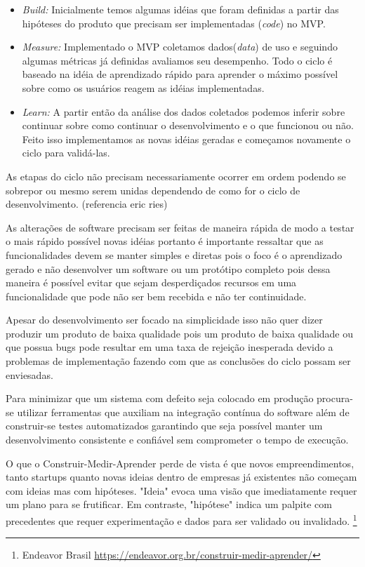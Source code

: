 \begin{itemize}
\item \emph{Build:} Inicialmente temos algumas idéias que foram definidas a partir das hipóteses do produto que precisam ser implementadas (\emph{code}) no MVP.
\item \emph{Measure:} Implementado o MVP coletamos dados(\emph{data}) de uso e seguindo algumas métricas já definidas avaliamos seu desempenho. Todo o ciclo é baseado na idéia de aprendizado rápido para aprender o máximo possível sobre como os usuários reagem as idéias implementadas.
\item \emph{Learn:} A partir então da análise dos dados coletados podemos inferir sobre continuar sobre como continuar o desenvolvimento e o que funcionou ou não. Feito isso implementamos as novas idéias geradas e começamos novamente o ciclo para validá-las.
\end{itemize}
\par As etapas do ciclo não precisam necessariamente ocorrer em ordem podendo se sobrepor  ou mesmo serem unidas dependendo de como for o ciclo de desenvolvimento. (referencia eric ries)
\par As alterações de software precisam ser feitas de maneira rápida de modo a testar o mais rápido possível novas idéias portanto é importante ressaltar que as funcionalidades devem se manter simples e diretas pois o foco é o aprendizado gerado e não desenvolver um software ou um protótipo completo pois dessa maneira é possível evitar que sejam desperdiçados recursos em uma funcionalidade que pode não ser bem recebida e não ter continuidade.
\par  Apesar do desenvolvimento ser focado na simplicidade isso não quer dizer produzir um produto de baixa qualidade pois um produto de baixa qualidade ou que possua bugs pode resultar em uma taxa de rejeição inesperada devido a problemas de implementação fazendo com que as conclusões do ciclo possam ser enviesadas.
\par Para minimizar que um sistema com defeito seja colocado em produção procura-se utilizar ferramentas que auxiliam na integração contínua do software além de construir-se testes automatizados garantindo que seja possível manter um desenvolvimento consistente e confiável sem comprometer o tempo de execução.
\par O que o Construir-Medir-Aprender perde de vista é que novos empreendimentos, tanto startups quanto novas ideias dentro de empresas já existentes não começam com ideias mas com hipóteses. "Ideia" evoca uma visão que imediatamente requer um plano para se frutificar. Em contraste, "hipótese" indica um palpite com precedentes que requer experimentação e dados para ser validado ou invalidado. \footnote{Endeavor Brasil \url{https://endeavor.org.br/construir-medir-aprender/}}
